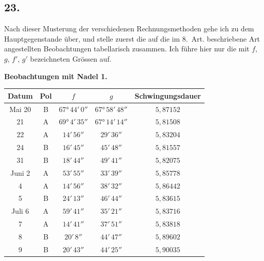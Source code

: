 \documentclass[12pt,a4paper]{article}
\begin{document}
\subsection*{23.}
Nach dieser Musterung der verschiedenen Rechnungsmethoden gehe ich zu dem Hauptgegenstande über, und stelle zuerst die auf die im 8.~Art. beschriebene Art angestellten Beobachtungen tabellarisch zusammen. Ich führe hier nur die mit $f$, $g$, $f'$, $g'$ bezeichneten Grössen auf.

\begin{center}
\small
\textbf{Beobachtungen mit Nadel 1.}
\begin{tabular}{c|c|c|c|c}
\hline
Datum & Pol & $f$ & $g$ & Schwingungsdauer \\
\hline
Mai 20 & B & $67°\,44'\,0''$ & $67°\,58'\,48''$ & $5{,}87152$ \\
21 & A & $69°\,4'\,35''$ & $67°\,14'\,14''$ & $5{,}81508$ \\
22 & A & $14'\,56''$ & $29'\,36''$ & $5{,}83204$ \\
24 & B & $16'\,45''$ & $45'\,48''$ & $5{,}81557$ \\
31 & B & $18'\,44''$ & $49'\,41''$ & $5{,}82075$ \\
Juni 2 & A & $53'\,55''$ & $33'\,39''$ & $5{,}85778$ \\
4 & A & $14'\,56''$ & $38'\,32''$ & $5{,}86442$ \\
5 & B & $24'\,13''$ & $46'\,44''$ & $5{,}83615$ \\
Juli 6 & A & $59'\,41''$ & $35'\,21''$ & $5{,}83716$ \\
7 & A & $14'\,41''$ & $37'\,51''$ & $5{,}83818$ \\
8 & B & $20'\,8''$ & $44'\,47''$ & $5{,}89602$ \\
9 & B & $20'\,43''$ & $44'\,25''$ & $5{,}90035$ \\
\hline
\end{tabular}
\end{center}
\end{document}
